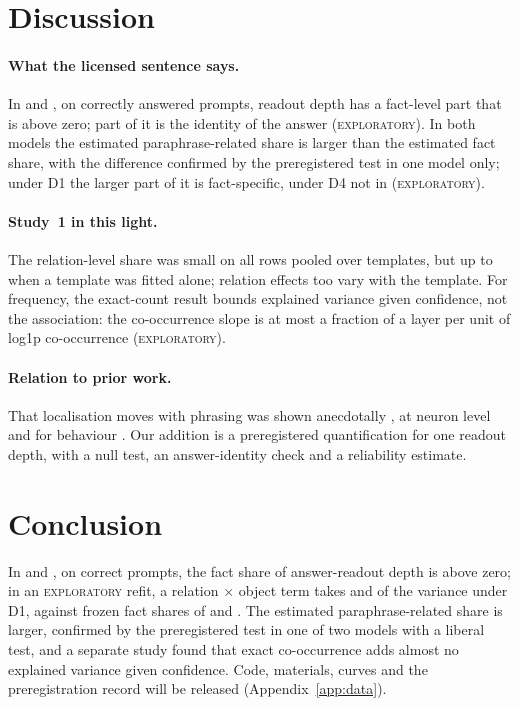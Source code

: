 \documentclass[11pt]{article}
\newcommand{\expl}{\textsc{exploratory}\xspace}
\newcommand{\olmo}{\OlmoTwoSevenB}
\newcommand{\llama}{\LlamaThreeOneEightB}
\newcommand{\SOne}{Study~1\xspace} %
\begin{document}
\section{Discussion}
\paragraph{What the licensed sentence says.}
In \llama{} and \olmo, on correctly answered prompts, readout depth has a fact-level part that is above zero; part of it is the identity of the answer (\expl).
In both models the estimated paraphrase-related share is larger than the estimated fact share, with the difference confirmed by the preregistered test in one model only; under D1 the larger part of it is fact-specific, under D4 not in \olmo{} (\expl).
\paragraph{\SOne in this light.}
The relation-level share was small on all rows pooled over templates, but up to \hrIccTemplateMax{} when a template was fitted alone; relation effects too vary with the template.
For frequency, the exact-count result bounds explained variance given confidence, not the association: the co-occurrence slope is at most a fraction of a layer per unit of log1p co-occurrence (\expl).
\paragraph{Relation to prior work.}
That localisation moves with phrasing was shown anecdotally \citep{benz2026knowledgedebugger}, at neuron level \citep{chen2024knowledge} and for behaviour \citep{elhelo2026task}.
Our addition is a preregistered quantification for one readout depth, with a null test, an answer-identity check and a reliability estimate.

\section{Conclusion}
In \llama{} and \olmo, on correct prompts, the fact share of answer-readout depth is above zero; in an \expl refit, a relation $\times$ object term takes \explObjObjDOneLlama{} and \explObjObjDOneOlmo{} of the variance under D1, against frozen fact shares of \ptIccDOneLlama{} and \ptIccDOneOlmo.
The estimated paraphrase-related share is larger, confirmed by the preregistered test in one of two models with a liberal test, and a separate study found that exact co-occurrence adds almost no explained variance given confidence.
Code, materials, curves and the preregistration record will be released (Appendix~\ref{app:data}).
\end{document}

